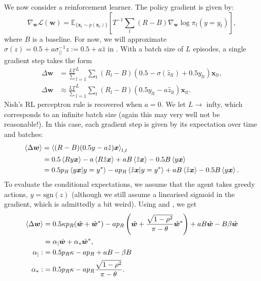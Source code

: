 \documentclass{article}
\renewcommand\b\bm
\begin{document}
We now consider a reinforcement learner.
The policy gradient is given by:
\begin{equation}
    \nabla_{\b{w}} \mathcal{L}(\b{w}) = \mathbb{E}_{ \{ \b{x}_t \sim p(\b{x}_t) \} } \left [ T^{-1} \sum_t (R - B) \nabla_{\b{w}} \log \pi_t (y = y_t) \right ],
\end{equation}
where $B$ is a baseline.
For now, we will approximate $\sigma(z) = 0.5 + a \sigma_{||}^{-1} z := 0.5 + a \hat{z} $ in .
With a batch size of $L$ episodes, a single gradient step takes the form
\begin{align}
    \Delta \b{w} &= \frac{L T} \sum_{l = 1}^L \sum_t (R_l - B) (0.5-\sigma(\hat{z}_{lt})+0.5 y_{lt}) \b{x}_{lt},\\
    \Delta \b{w} &\approx \frac{L T} \sum_{l = 1}^L \sum_t (R_l - B) (0.5 y_{lt} - a \hat{z}_{lt}) \b{x}_{lt}.
\end{align}
Nish's RL perceptron rule is recovered when $a = 0$.
We let $L \rightarrow$ infty, which corresponds to an infinite batch size (again this may very well not be reasonable!).
In this case, each gradient step is given by its expectation over time and batches:
\begin{align}
    \braket{\Delta \b{w}} &= \braket{(R - B) (0.5 y - a \hat{z}) \b{x}}_{l, t}\\
    &= 0.5 \braket{R y \b{x}} - a \braket{R \hat{z} \b{x}} + a B \braket{\hat{z} \b{x}} - 0.5 B \braket{y \b{x}}\\
    &= 0.5 p_R \braket{y \b{x} | y = y^*} - a p_R \braket{ \hat{z} \b{x} | y = y^*} + a B \braket{\hat{z} \b{x}} - 0.5 B \braket{y \b{x}}.
\end{align}
To evaluate the conditional expectations, we assume that the agent takes greedy actions, $y = \text{sgn}(z)$ (although we still assume a linearised sigmoid in the gradient, which is admittedly a bit weird).
Using  and , we get
\begin{align}
    \braket{\Delta \b{w}} &= 0.5 \kappa p_R (\hat{\b{w}} + \hat{\b{w}}^*) - a p_R \left (\hat{\b{w}} + \frac{\sqrt{1-\rho^2} }{\pi - \theta} \hat{\b{w}}^* \right ) + a B \hat{\b{w}} - B \beta \hat{\b{w}}\\
    &= \alpha_{|} \hat{\b{w}} + \alpha_{*} \hat{\b{w}}^*,\\
    \alpha_{|} :&= 0.5 p_R \kappa - a p_R  + a B - \beta B\\
    \alpha_* :&= 0.5 p_R \kappa - a p_R \frac{\sqrt{1-\rho^2} }{\pi - \theta}.
\end{align}
\end{document}
